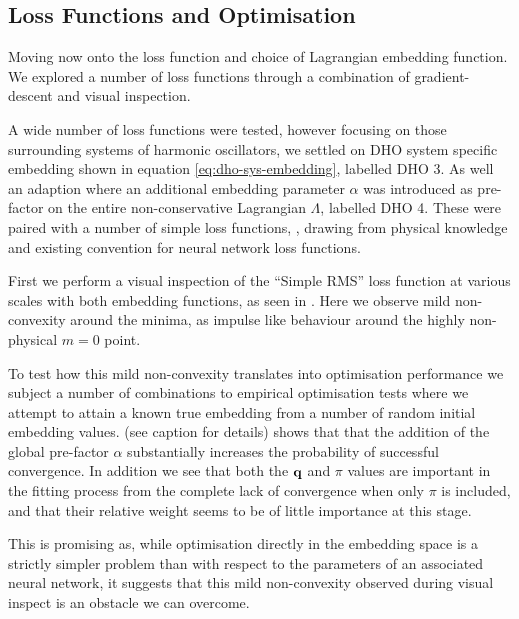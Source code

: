 \subsection{Loss Functions and Optimisation}
\label{sec:res-lf}

Moving now onto the loss function and choice of Lagrangian embedding function. We explored a number of loss functions through a combination of gradient-descent and visual inspection.

A wide number of loss functions were tested, however focusing on those surrounding systems of harmonic oscillators, we settled on DHO system specific embedding shown in equation \eqref{eq:dho-sys-embedding}, labelled DHO 3.
As well an adaption where an additional embedding parameter $\alpha$ was introduced as pre-factor on the entire non-conservative Lagrangian $\Lambda$, labelled DHO 4. 
These were paired with a number of simple loss functions, , drawing from physical knowledge and existing convention for neural network loss functions.

First we perform a visual inspection of the \enquote{Simple RMS} loss function at various scales with both embedding functions, as seen in . Here we observe mild non-convexity around the minima, as impulse like behaviour around the highly non-physical $m = 0$ point.

To test how this mild non-convexity translates into optimisation performance we subject a number of combinations to empirical optimisation tests where we attempt to attain a known true embedding from a number of random initial embedding values.  (see caption for details) shows that that the addition of the global pre-factor $\alpha$ substantially increases the probability of successful convergence.  In addition we see that both the $\vb{q}$ and $\pi$ values are important in the fitting process from the complete lack of convergence when only $\pi$ is included, and that their relative weight seems to be of little importance at this stage.

This is promising as, while optimisation directly in the embedding space is a strictly simpler problem than with respect to the parameters of an associated neural network, it suggests that this mild non-convexity observed during visual inspect is an obstacle we can overcome.

